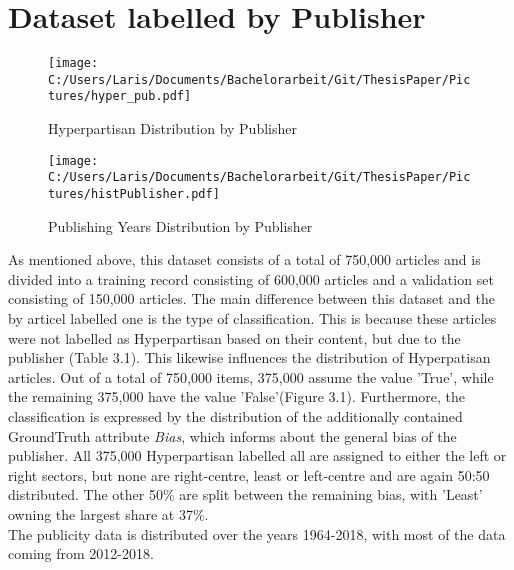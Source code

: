 \documentclass[a4paper, 11pt,titlepage,oneside,openany]{book}
\begin{document}
\section{Dataset labelled by Publisher}
\begin{figure}[h]
	\begin{minipage}{.45\linewidth}
		\texttt{[image: C:/Users/Laris/Documents/Bachelorarbeit/Git/ThesisPaper/Pictures/hyper\_pub.pdf]}
		\caption{Hyperpartisan Distribution by Publisher}
	\end{minipage}
	\hspace{.1\linewidth}%
	\begin{minipage}{.45\linewidth}
		\texttt{[image: C:/Users/Laris/Documents/Bachelorarbeit/Git/ThesisPaper/Pictures/histPublisher.pdf]}
		\caption{Publishing Years Distribution by Publisher}
	\end{minipage}
\end{figure} As mentioned above, this dataset consists of a total of 750,000 articles and is divided into a training record consisting of 600,000 articles and a validation set consisting of 150,000 articles.
The main difference between this dataset and the by articel labelled one is the type of classification. This is because these articles were not labelled as Hyperpartisan based on their content, but due to the publisher (Table 3.1). This likewise influences the distribution of Hyperpatisan articles.
 Out of a total of 750,000 items, 375,000 assume the value 'True', while the remaining 375,000 have the value 'False'(Figure 3.1). 
Furthermore, the classification is expressed by the distribution of the additionally contained GroundTruth attribute \textit{Bias}, which informs about the general bias of the publisher. All 375,000 Hyperpartisan labelled all are assigned to either the left or right sectors, but none are right-centre, least or left-centre and are again 50:50 distributed. The other 50\% are split between the remaining bias, with 'Least' owning the largest share at 37\%.\\
The publicity data is distributed over the years 1964-2018, with most of the data coming from 2012-2018.
\end{document}
